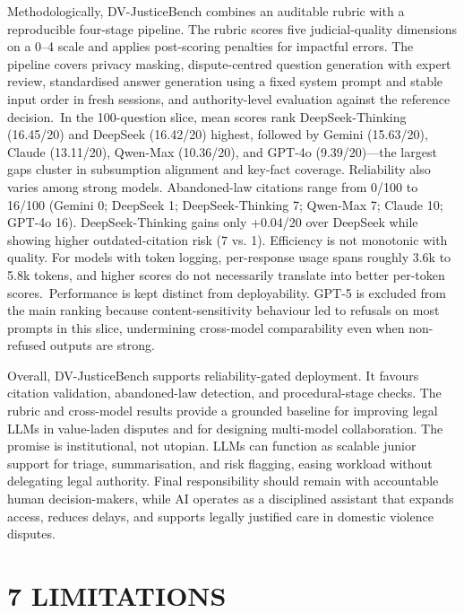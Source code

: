 Methodologically, DV-JusticeBench combines an auditable rubric with a reproducible four-stage pipeline. The rubric scores five judicial-quality dimensions on a 0--4 scale and applies post-scoring penalties for impactful errors. The pipeline covers privacy masking, dispute-centred question generation with expert review, standardised answer generation using a fixed system prompt and stable input order in fresh sessions, and authority-level evaluation against the reference decision.~In the 100-question slice, mean scores rank DeepSeek-Thinking (16.45/20) and DeepSeek (16.42/20) highest, followed by Gemini (15.63/20), Claude (13.11/20), Qwen-Max (10.36/20), and GPT-4o (9.39/20)---the largest gaps cluster in subsumption alignment and key-fact coverage. Reliability also varies among strong models. Abandoned-law citations range from 0/100 to 16/100 (Gemini 0; DeepSeek 1; DeepSeek-Thinking 7; Qwen-Max 7; Claude 10; GPT-4o 16). DeepSeek-Thinking gains only +0.04/20 over DeepSeek while showing higher outdated-citation risk (7 vs. 1). Efficiency is not monotonic with quality. For models with token logging, per-response usage spans roughly 3.6k to 5.8k tokens, and higher scores do not necessarily translate into better per-token scores.~Performance is kept distinct from deployability. GPT-5 is excluded from the main ranking because content-sensitivity behaviour led to refusals on most prompts in this slice, undermining cross-model comparability even when non-refused outputs are strong.

Overall, DV-JusticeBench supports reliability-gated deployment. It favours citation validation, abandoned-law detection, and procedural-stage checks. The rubric and cross-model results provide a grounded baseline for improving legal LLMs in value-laden disputes and for designing multi-model collaboration. The promise is institutional, not utopian. LLMs can function as scalable junior support for triage, summarisation, and risk flagging, easing workload without delegating legal authority. Final responsibility should remain with accountable human decision-makers, while AI operates as a disciplined assistant that expands access, reduces delays, and supports legally justified care in domestic violence disputes.

\hypertarget{limitations}{%
\section{\texorpdfstring{\textbf{7 LIMITATIONS}}{7 LIMITATIONS}}\label{limitations}}

